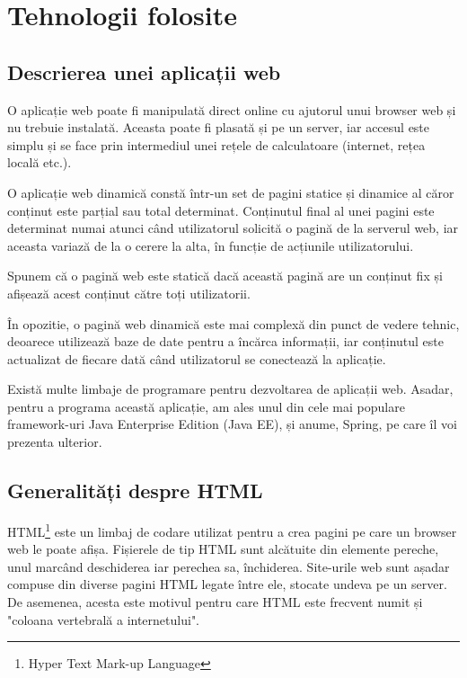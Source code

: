 \chapter{Tehnologii folosite}

\section{Descrierea unei aplicații web}

O aplicație web poate fi manipulată direct online cu ajutorul unui browser web și nu trebuie instalată. Aceasta poate fi plasată și pe un server, iar accesul este simplu și se face prin intermediul unei rețele de calculatoare (internet, rețea locală etc.).\newline

O aplicație web dinamică constă într-un set de pagini statice și dinamice al căror conținut este parțial sau total determinat. Conținutul final al unei pagini este determinat numai atunci când utilizatorul solicită o pagină de la serverul web, iar aceasta variază de la o cerere la alta, în funcție de acțiunile utilizatorului.\newline

Spunem că o pagină web este statică dacă această pagină are un conținut fix și afișează acest conținut către toți utilizatorii.

În opozitie, o pagină web dinamică este mai complexă din punct de vedere tehnic, deoarece utilizează baze de date pentru a încărca informații, iar conținutul este actualizat de fiecare dată când utilizatorul se conectează la aplicație.\newline

Există multe limbaje de programare pentru dezvoltarea de aplicații web.
Asadar, pentru a programa această aplicație, am ales unul din cele mai populare framework-uri Java Enterprise Edition (Java EE), și anume, Spring, pe care îl voi prezenta ulterior.
\newline
\section{Generalități despre HTML}

HTML\footnote{Hyper Text Mark-up Language} este un limbaj de codare utilizat pentru a crea pagini pe care un browser web le poate afișa. Fișierele de tip HTML sunt alcătuite din elemente pereche, unul marcând deschiderea iar perechea sa, închiderea.\newline
Site-urile web sunt așadar compuse din diverse pagini HTML legate între ele, stocate undeva pe un server. De asemenea, acesta este motivul pentru care HTML este frecvent numit și "coloana vertebrală a internetului".\newline

